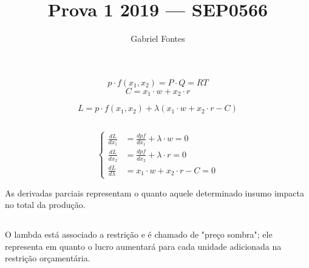 \documentclass{article}
\title{Prova 1 2019 --- SEP0566}
\author{Gabriel Fontes}
\begin{document}
\maketitle

\section{}
\subsection{}
\[
	p \cdot f(x_1, x_2) = P \cdot Q = RT
\]
\[
	C = x_1 \cdot w + x_2 \cdot r
\]

\[
	L = p \cdot f(x_1, x_2) + \lambda(x_1 \cdot w + x_2 \cdot r - C)
\]

\subsection{}

\[
	\left\{
	\begin{aligned}
		\frac{dL}{dx_1}     & = \frac{dpf}{dx_1} + \lambda \cdot w = 0 \\
		\frac{dL}{dx_2}     & = \frac{dpf}{dx_2} + \lambda \cdot r = 0 \\
		\frac{dL}{d\lambda} & = x_1 \cdot w + x_2 \cdot r - C  = 0
	\end{aligned}
	\right.
\]

As derivadas parciais representam o quanto aquele determinado insumo impacta
no total da produção.

\subsection{}

O lambda está associado a restrição e é chamado de "preço sombra"; ele
representa em quanto o lucro aumentará para cada unidade adicionada na
restrição orçamentária.

\section{}
\subsection{}
\end{document}
